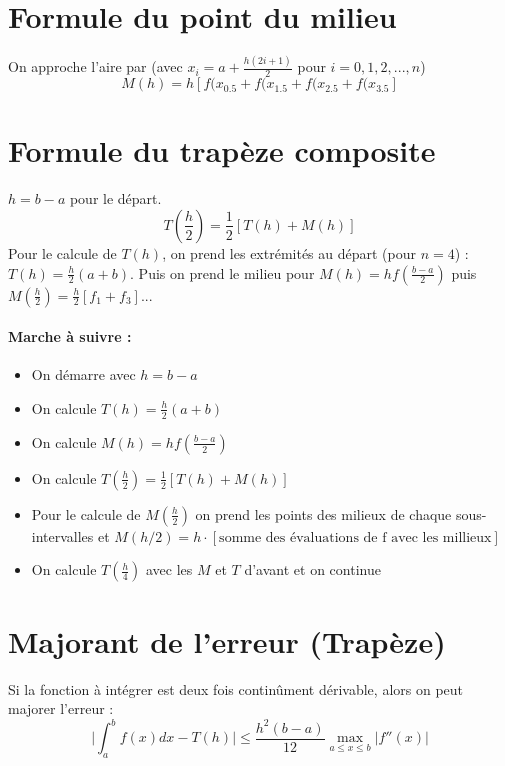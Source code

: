 \documentclass[a4paper,9pt]{extarticle}
\begin{document}
\begin{multicols*}{2}
\section{Formule du point du milieu}

On approche l'aire par (avec $x_i=a+\frac{h(2i+1)}{2}$ pour $i=0,1,2,...,n$)
$$
M(h)=h[f(x_{0.5}+f(x_{1.5}+f(x_{2.5}+f(x_{3.5}]
$$

\section{Formule du trapèze composite}
$h=b-a$ pour le départ.
$$
T(\frac{h}{2})=\frac{1}{2}[T(h)+M(h)]
$$
Pour le calcule de $T(h)$, on prend les extrémités au départ (pour $n=4$) : $T(h)=\frac{h}{2}(a+b)$. Puis on prend le milieu pour $M(h)=hf(\frac{b-a}{2})$ puis $M(\frac{h}{2})=\frac{h}{2}[f_1+f_3]$...

\paragraph*{Marche à suivre :}
\begin{itemize}
    \item On démarre avec $h=b-a$
    \item On calcule $T(h)=\frac{h}{2}(a+ b)$
    \item On calcule $M(h)=hf(\frac{b-a}{2})$
    \item On calcule $T(\frac{h}{2})=\frac{1}{2}[T(h)+M(h)]$
    \item Pour le calcule de $M(\frac{h}{2})$ on prend les points des milieux de chaque sous-intervalles et $M(h/2)=h\cdot[\text{somme des évaluations de f avec les millieux}]$
    \item On calcule $T(\frac{h}{4})$ avec les $M$ et $T$ d'avant et on continue
\end{itemize}

\section{Majorant de l'erreur (Trapèze)}
Si la fonction à intégrer est deux fois continûment dérivable, alors on peut majorer l'erreur :
$$
\Big|\int_a^bf(x)dx-T(h)\Big|\leq \frac{h^2(b-a)}{12} \max_{a\leq x \leq b}|f''(x)|
$$


\end{multicols*}
\end{document}
